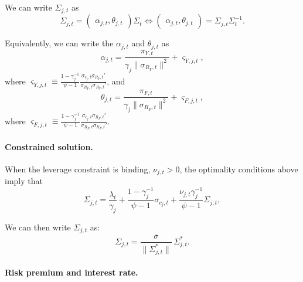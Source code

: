\documentclass[11pt,english]{article}
\begin{document}
We can write $\Sigma_{j,t}$ as
\begin{equation}
    \Sigma_{j,t} = 
	\begin{pmatrix}
		\alpha_{j,t}, 
		\theta_{j,t}
	\end{pmatrix}
	\Sigma_t \iff 
	\begin{pmatrix}
		\alpha_{j,t}, 
		\theta_{j,t}
	\end{pmatrix} = \Sigma_{j,t}\Sigma_t^{-1}.
\end{equation}

Equivalently, we can write the $\alpha_{j,t}$ and $\theta_{j,t}$ as
\begin{equation}
    \alpha_{j,t} = \frac{\pi_{Y,t}}{\gamma_j \|\sigma_{R_Y,t}\|^2} + \varsigma_{Y,j,t},
\end{equation}
where $\varsigma_{Y,j,t} \equiv \frac{1 - \gamma_j^{-1}}{\psi-1} \frac{\sigma_{c_j,t} \sigma_{R_Y,t}'}{\sigma_{R_Y,t} \sigma_{R_Y,t}'}$, 
and
\begin{equation}
    \theta_{j,t} = \frac{\pi_{F,t}}{\gamma_j \|\sigma_{R_F,t}\|^2} + \varsigma_{F,j,t},
\end{equation}
where $\varsigma_{F,j,t} \equiv \frac{1 - \gamma_j^{-1}}{\psi-1} \frac{\sigma_{c_j,t} \sigma_{R_F,t}'}{\sigma_{R_F,t} \sigma_{R_F,t}'}$.

\paragraph{Constrained solution.}
When the leverage constraint is binding, $\nu_{j,t} > 0$, the optimality conditions above imply that
\begin{equation}
	\Sigma_{j,t} = \frac{\lambda_t}{\gamma_j} + \frac{1 - \gamma_j^{-1}}{\psi-1} \sigma_{c_j,t}+ \frac{\nu_{j,t}\gamma_j^{-1}}{\psi-1} \Sigma_{j,t},
\end{equation}

We can then write $\Sigma_{j,t}$ as:	
\begin{equation}
    \Sigma_{j,t} = \frac{\overline{\sigma}}{\|\Sigma_{j,t}^*\|}\,\Sigma_{j,t}^{*}.
\end{equation}

\paragraph{Risk premium and interest rate.} 
\end{document}
